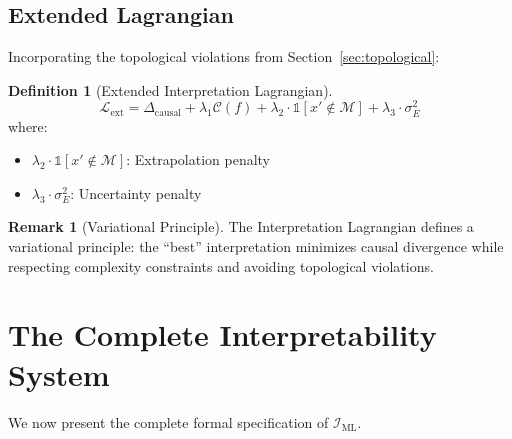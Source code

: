 \documentclass[11pt,a4paper]{article}
\theoremstyle{definition}
\newtheorem{definition}{Definition}[section]
\newtheorem{remark}{Remark}[section]
\newcommand{\IML}{\mathcal{I}_{\text{ML}}}
\newcommand{\Dcausal}{\Delta_{\text{causal}}}
\newcommand{\Complex}{\mathcal{C}}
\newcommand{\Manifold}{\mathcal{M}}
\begin{document}
\subsection{Extended Lagrangian}

Incorporating the topological violations from Section~\ref{sec:topological}:

\begin{definition}[Extended Interpretation Lagrangian]
\begin{equation}
\mathcal{L}_{\text{ext}} = \Dcausal + \lambda_1 \Complex(f) + \lambda_2 \cdot \mathbb{1}[x' \notin \Manifold] + \lambda_3 \cdot \sigma^2_E
\end{equation}
where:
\begin{itemize}    \item $\lambda_2 \cdot \mathbb{1}[x' \notin \Manifold]$: Extrapolation penalty
    \item $\lambda_3 \cdot \sigma^2_E$: Uncertainty penalty
\end{itemize}
\end{definition}

\begin{remark}[Variational Principle]
The Interpretation Lagrangian defines a variational principle: the ``best'' interpretation minimizes causal divergence while respecting complexity constraints and avoiding topological violations.
\end{remark}

\section{The Complete Interpretability System}
\label{sec:complete}

We now present the complete formal specification of $\IML$.
\end{document}

